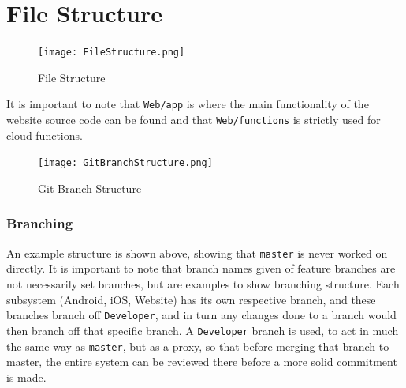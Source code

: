 \documentclass[12pt]{article}
\begin{document}
\section{File Structure}
  \flushleft
  \begin{figure}
  \texttt{[image: FileStructure.png]}
  \caption{File Structure}
  \label{FileStructure}
  \end{figure}

  It is important to note that \texttt{Web/app} is where the main functionality of the website source code can be found and that \texttt{Web/functions} is strictly used for cloud functions.

  \begin{figure}
  \texttt{[image: GitBranchStructure.png]}
  \caption{Git Branch Structure}
  \label{GitBranchStructure}
  \end{figure}

\flushleft\subsubsection{Branching}
  An example structure is shown above, showing that \texttt{master} is never worked on directly. It is important to note that branch names given of feature branches are not necessarily set branches, but are examples to show branching structure. Each subsystem (Android, iOS, Website) has its own respective branch, and these branches branch off \texttt{Developer}, and in turn any changes done to a branch would then branch off that specific branch.
  A \texttt{Developer} branch is used, to act in much the same way as \texttt{master}, but as a proxy, so that before merging that branch to master, the entire system can be reviewed there before a more solid commitment is made.
\end{document}
